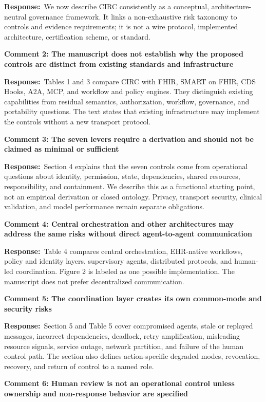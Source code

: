 \documentclass[11pt]{article}
\newcommand{\comment}[1]{\par\medskip\noindent\textbf{#1}\par}
\newcommand{\response}{\noindent\textbf{Response:}\ }
\begin{document}
\response We now describe CIRC consistently as a conceptual, architecture-neutral governance
framework. It links a non-exhaustive risk taxonomy to controls and evidence requirements; it is not a
wire protocol, implemented architecture, certification scheme, or standard.

\comment{Comment 2: The manuscript does not establish why the proposed controls are distinct from existing standards and infrastructure}

\response Tables 1 and 3 compare CIRC with FHIR, SMART on FHIR, CDS Hooks, A2A, MCP, and workflow and
policy engines. They distinguish existing capabilities from residual semantics, authorization,
workflow, governance, and portability questions. The text states that existing infrastructure may
implement the controls without a new transport protocol.

\comment{Comment 3: The seven levers require a derivation and should not be claimed as minimal or sufficient}

\response Section 4 explains that the seven controls come from operational questions about identity,
permission, state, dependencies, shared resources, responsibility, and containment. We describe this
as a functional starting point, not an empirical derivation or closed ontology. Privacy, transport
security, clinical validation, and model performance remain separate obligations.

\comment{Comment 4: Central orchestration and other architectures may address the same risks without direct agent-to-agent communication}

\response Table 4 compares central orchestration, EHR-native workflows, policy and identity layers,
supervisory agents, distributed protocols, and human-led coordination. Figure 2 is labeled as one
possible implementation. The manuscript does not prefer decentralized communication.

\comment{Comment 5: The coordination layer creates its own common-mode and security risks}

\response Section 5 and Table 5 cover compromised agents, stale or replayed messages, incorrect
dependencies, deadlock, retry amplification, misleading resource signals, service outage, network
partition, and failure of the human control path. The section also defines action-specific degraded
modes, revocation, recovery, and return of control to a named role.

\comment{Comment 6: Human review is not an operational control unless ownership and non-response behavior are specified}
\end{document}
